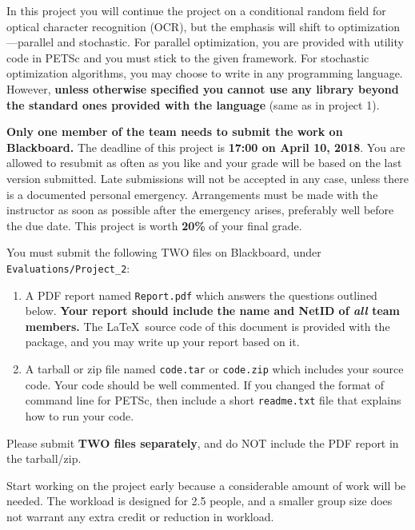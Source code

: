 \documentclass[11pt]{report}
\begin{document}
\maketitle


In this project you will continue the project on a conditional random field for optical character recognition (OCR),
but the emphasis will shift to optimization---parallel and stochastic.
For parallel optimization, 
you are provided with utility code in PETSc and you must stick to the given framework.
For stochastic optimization algorithms, you may choose to write in any programming
language.
However, {\bf unless otherwise specified you cannot use any library beyond the standard ones provided with the language} (same as in project 1).


{\bf Only one member of the team needs to submit the work on Blackboard.}
The deadline of this project is {\bf 17:00 on April 10, 2018}.
You are allowed to resubmit as often
as you like and your grade will be based on the last version submitted.
Late submissions will not be accepted in any case, unless there is a documented personal emergency.  Arrangements must be made with the instructor as soon as possible after the emergency arises,
preferably well before the due date.
This project is worth {\bf 20\%} of your final grade.


You must submit the following TWO files on Blackboard, under \verb#Evaluations/Project_2#:
\vspace{-1em}
\begin{enumerate}
	\item  A PDF report named \verb#Report.pdf# which answers the questions outlined below.
	{\bf Your report should include the name and NetID of \emph{all} team members.}
	The \LaTeX\ source code of this document is provided with the package, and you may write up your report based on it.
	\item A tarball or zip file named \verb#code.tar# or \verb#code.zip# which includes  your source code.
	Your code should be well commented.
	If you changed the format of command line for PETSc, then include a short \verb#readme.txt# file that explains how to run your code.
\end{enumerate}
\vspace{-1em}

Please submit {\bf TWO files separately}, and do NOT include the PDF report in the tarball/zip.


Start working on the project early
because a considerable amount of work will be needed.
The workload is designed for 2.5 people, and a smaller group size  does not warrant any extra credit or reduction in workload.
\end{document}
